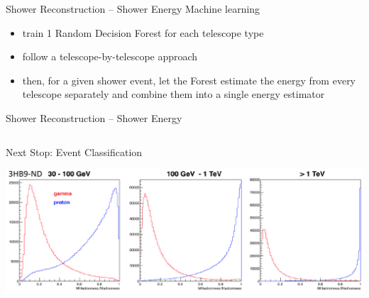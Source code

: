 \documentclass[8pt]{beamer}
\begin{document}
    \begin{frame}{Shower Reconstruction -- Shower Energy}
                 {Machine learning}
        \begin{itemize}
            \item train 1 Random Decision Forest for each telescope type
            \item follow a telescope-by-telescope approach
            \medskip
            \item then, for a given shower event, let the Forest estimate the energy from
                every telescope separately and combine them into a single energy
                estimator
        \end{itemize}
        \setlength{\figureheight}{4.5cm}
        \setlength{\figurewidth}{4.5cm}
        
    \end{frame}


    \begin{frame}{Shower Reconstruction -- Shower Energy}
        \setlength{\figureheight}{4.cm}
        \setlength{\figurewidth}{4.5cm}
        \\
        \begin{columns}
            \setlength{\figurewidth}{.5\textwidth}
                
                
        \end{columns}
    \end{frame}



    \begin{frame}{Next Stop: Event Classification}
        \setlength{\figureheight}{4.cm}
        \setlength{\figurewidth}{4.5cm}
        \begin{columns}
                }
            \column{.33\textwidth}
                }
            \column{.33\textwidth}
                }
        \end{columns}
        \centering
        \includegraphics[width=.9\textwidth]{pics/hadroness_abelardo}
    \end{frame}
\end{document}

